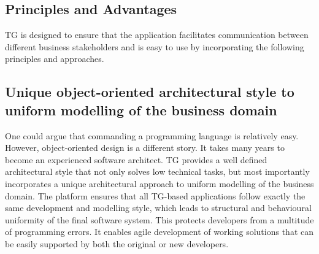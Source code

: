 \documentclass[a4paper,12pt,oneside,openright,final]{memoir} %
\begin{document}
 \subsection*{Principles and Advantages}
  	TG is designed to ensure that the application facilitates communication between different business stakeholders and is easy to use by incorporating the following principles and approaches.

\subsection*{Unique object-oriented architectural style to uniform modelling of the business domain}
	One could argue that commanding a programming language is relatively easy. 
  	However, object-oriented design is a different story.
  	It takes many years to become an experienced software architect.
  	TG provides a well defined architectural style that not only solves low technical tasks, but most importantly incorporates a unique architectural approach to uniform modelling of the business domain.
  	The platform ensures that all TG-based applications follow exactly the same development and modelling style, which leads to structural and behavioural uniformity of the final software system.
  	This protects developers from a multitude of programming errors.
	It enables agile development of working solutions that can be easily supported by both the original or new developers.
\end{document}
